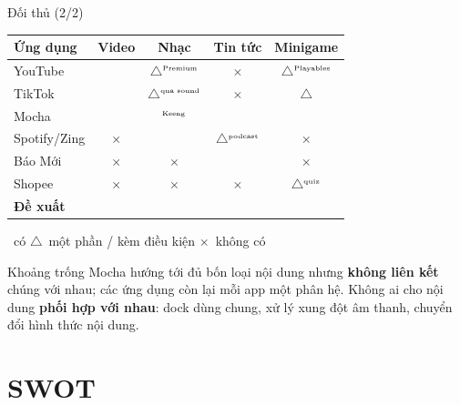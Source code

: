 \documentclass[aspectratio=169]{beamer}
\newcommand{\cmark}{\textcolor{brandteal}{\checkmark}}
\newcommand{\pmark}{\textcolor{brandteal!65!black}{$\triangle$}}
\newcommand{\xmark}{\textcolor{brandgray}{$\times$}}
\begin{document}
\begin{frame}{Đối thủ (2/2)}
  \begin{center}
    \small
    \begin{tabular}{@{}p{2.3cm}cccc@{}}
      \toprule
      \textbf{Ứng dụng} & \textbf{Video} & \textbf{Nhạc} & \textbf{Tin tức} & \textbf{Minigame} \\
      \midrule
      YouTube & \cmark & \pmark$^{\text{\tiny Premium}}$ & \xmark & \pmark$^{\text{\tiny Playables}}$ \\
      TikTok & \cmark & \pmark$^{\text{\tiny qua sound}}$ & \xmark & \pmark \\
      Mocha & \cmark & \cmark$^{\text{\tiny Keeng}}$ & \cmark & \cmark \\
      Spotify/Zing & \xmark & \cmark & \pmark$^{\text{\tiny podcast}}$ & \xmark \\
      Báo Mới & \xmark & \xmark & \cmark & \xmark \\
      Shopee & \xmark & \xmark & \xmark & \pmark$^{\text{\tiny quiz}}$ \\
      \midrule
      \textbf{Đề xuất} & \textbf{\cmark} & \textbf{\cmark} & \textbf{\cmark} & \textbf{\cmark} \\
      \bottomrule
    \end{tabular}
  \end{center}
  \vspace{-1mm}
  \begin{center}
    {\scriptsize \cmark~có \quad \pmark~một phần / kèm điều kiện \quad \xmark~không có}
  \end{center}
  \begin{block}{Khoảng trống}
    \footnotesize Mocha hướng tới đủ bốn loại nội dung nhưng \textbf{không liên kết} chúng với nhau; các ứng dụng còn lại mỗi app một phân hệ. Không ai cho nội dung \textbf{phối hợp với nhau}: dock dùng chung, xử lý xung đột âm thanh, chuyển đổi hình thức nội dung.
  \end{block}
\end{frame}

\section{SWOT}
\end{document}
